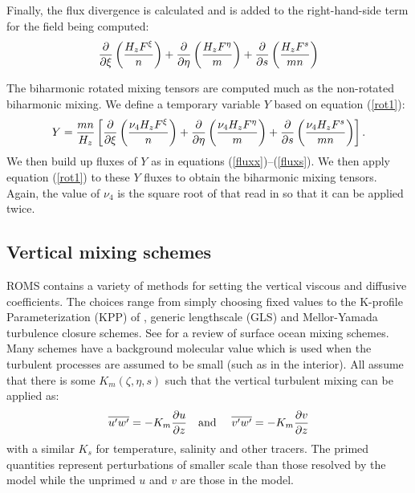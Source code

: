 Finally, the flux divergence is calculated and is added to the
right-hand-side term for the field being computed:
\begin{equation}
  {\partial \over \partial \xi} \left( { H_z F^\xi \over n} \right) +
  {\partial \over \partial \eta} \left( { H_z F^\eta \over m} \right) +
  {\partial \over \partial s}
  \left( { H_z F^s \over mn} \right)
\label{rot1}
\end{equation}

The biharmonic rotated mixing tensors are computed much as the
non-rotated biharmonic mixing.  We define a temporary variable $Y$
based on equation (\ref{rot1}):
\begin{equation}
  Y = {mn \over H_z} \left[
  {\partial \over \partial \xi} \left( {\nu_4 H_z F^\xi \over n} \right) +
  {\partial \over \partial \eta} \left( {\nu_4 H_z F^\eta \over m} \right) +
  {\partial \over \partial s}
  \left( {\nu_4 H_z F^s \over mn} \right)
  \right] .
\end{equation}
We then build up fluxes of $Y$ as in equations
(\ref{fluxx})--(\ref{fluxs}).  We then apply equation (\ref{rot1})
to these $Y$ fluxes to obtain the biharmonic mixing tensors. Again, the
value of $\nu_4$ is the square root of that read in so that it can be
applied twice.

\subsection{Vertical mixing schemes}
\label{Vmix}
ROMS contains a variety of methods for setting the vertical viscous and
diffusive coefficients. The choices range from simply choosing fixed
values to the K-profile Parameterization (KPP) of \citet{Large94},
generic lengthscale (GLS) and Mellor-Yamada turbulence
closure schemes.  See \citet{Large98} for a review of surface ocean
mixing schemes.  Many schemes have a background molecular value which
is used when the turbulent processes are assumed to be small (such as
in the interior). All assume that there is some $K_m(\zeta,\eta,s)$
such that the vertical turbulent mixing can be applied as:
\begin{equation}
    \overline{u' w'} = -K_m {\partial u \over \partial z}
    \mbox{\quad and \quad}
    \overline{v' w'} = -K_m {\partial v \over \partial z}
\end{equation}
with a similar $K_s$ for temperature, salinity and other tracers. The
primed quantities represent perturbations of smaller scale than those
resolved by the model while the unprimed $u$ and $v$ are those in
the model.

